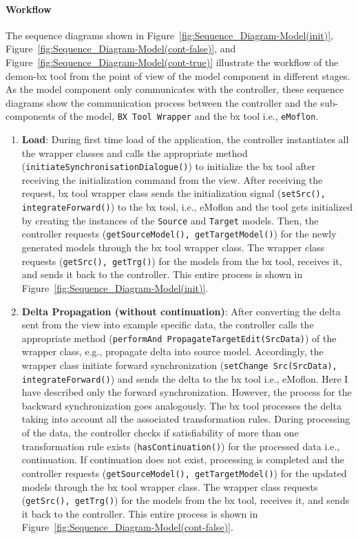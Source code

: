 \paragraph{Workflow}
The sequence diagrams shown in Figure~\ref{fig:Sequence_Diagram-Model(init)}, Figure~\ref{fig:Sequence_Diagram-Model(cont-false)}, and Figure~\ref{fig:Sequence_Diagram-Model(cont-true)} illustrate the workflow of the demon-bx tool from the point of view of the model component in different stages. As the model component only communicates with the controller, these sequence diagrams show the communication process between the controller and the sub-components of the model, \texttt{BX Tool Wrapper} and the bx tool i.e., \texttt{eMoflon}.
\begin{enumerate}
	\item {\textbf{Load}: During first time load of the application, the controller instantiates all the wrapper classes and calls the appropriate method (\texttt{initiateSynchronisationDialogue()}) to initialize the bx tool after receiving the initialization command from the view. After receiving the request, bx tool wrapper class sends the initialization signal (\texttt{setSrc(), integrateForward()}) to the bx tool, i.e., eMoflon and the tool gets initialized by creating the instances of the \texttt{Source} and \texttt{Target} models. Then, the controller requests (\texttt{getSourceModel(), getTargetModel()}) for the newly generated models through the bx tool wrapper class. The wrapper class requests (\texttt{getSrc(), getTrg()}) for the models from the bx tool, receives it, and sends it back to the controller. This entire process is shown in Figure~\ref{fig:Sequence_Diagram-Model(init)}.}
	
	\item {\textbf{Delta Propagation (without continuation)}: After converting the delta sent from the view into example specific data, the controller calls the appropriate method (\texttt{performAnd PropagateTargetEdit(SrcData)}) of the wrapper class, e.g., propagate delta into source model. Accordingly, the wrapper class initiate forward synchronization 
	(\texttt{setChange Src(SrcData), integrateForward()}) and sends the delta to the bx tool i.e., eMoflon. Here I have described only the forward synchronization. However, the process for the backward synchronization goes analogously. The bx tool processes the delta taking into account all the associated transformation rules. During processing of the data, the controller checks if satisfiability of more than one transformation rule exists (\texttt{hasContinuation()}) for the processed data i.e., continuation. If continuation does not exist, processing is completed and the controller requests (\texttt{getSourceModel(), getTargetModel()}) for the updated models through the bx tool wrapper class. The wrapper class requests (\texttt{getSrc(), getTrg()}) for the models from the bx tool, receives it, and sends it back to the controller. This entire process is shown in Figure~\ref{fig:Sequence_Diagram-Model(cont-false)}.}
	

\end{enumerate}
